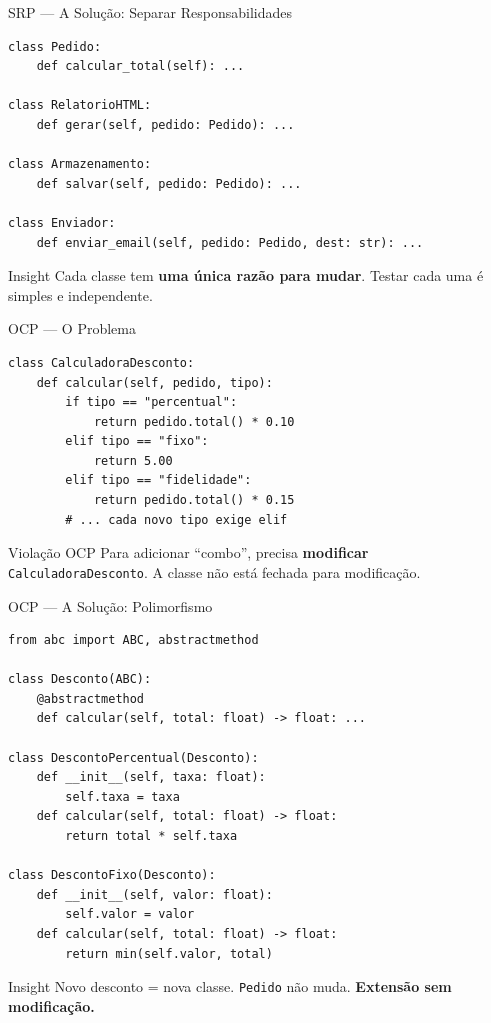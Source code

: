 \documentclass[aspectratio=169]{beamer}
\begin{document}
\begin{frame}[fragile]{SRP --- A Solução: Separar Responsabilidades}
\begin{lstlisting}
class Pedido:
    def calcular_total(self): ...

class RelatorioHTML:
    def gerar(self, pedido: Pedido): ...

class Armazenamento:
    def salvar(self, pedido: Pedido): ...

class Enviador:
    def enviar_email(self, pedido: Pedido, dest: str): ...
\end{lstlisting}

\begin{exampleblock}{Insight}
Cada classe tem \textbf{uma única razão para mudar}. Testar cada uma é simples e independente.
\end{exampleblock}
\end{frame}

\begin{frame}[fragile]{OCP --- O Problema}
\begin{lstlisting}
class CalculadoraDesconto:
    def calcular(self, pedido, tipo):
        if tipo == "percentual":
            return pedido.total() * 0.10
        elif tipo == "fixo":
            return 5.00
        elif tipo == "fidelidade":
            return pedido.total() * 0.15
        # ... cada novo tipo exige elif
\end{lstlisting}

\begin{alertblock}{Violação OCP}
Para adicionar ``combo'', precisa \textbf{modificar} \texttt{CalculadoraDesconto}. A classe não está fechada para modificação.
\end{alertblock}
\end{frame}

\begin{frame}[fragile]{OCP --- A Solução: Polimorfismo}
\begin{lstlisting}
from abc import ABC, abstractmethod

class Desconto(ABC):
    @abstractmethod
    def calcular(self, total: float) -> float: ...

class DescontoPercentual(Desconto):
    def __init__(self, taxa: float):
        self.taxa = taxa
    def calcular(self, total: float) -> float:
        return total * self.taxa

class DescontoFixo(Desconto):
    def __init__(self, valor: float):
        self.valor = valor
    def calcular(self, total: float) -> float:
        return min(self.valor, total)
\end{lstlisting}

\begin{exampleblock}{Insight}
Novo desconto = nova classe. \texttt{Pedido} não muda. \textbf{Extensão sem modificação.}
\end{exampleblock}
\end{frame}
\end{document}
